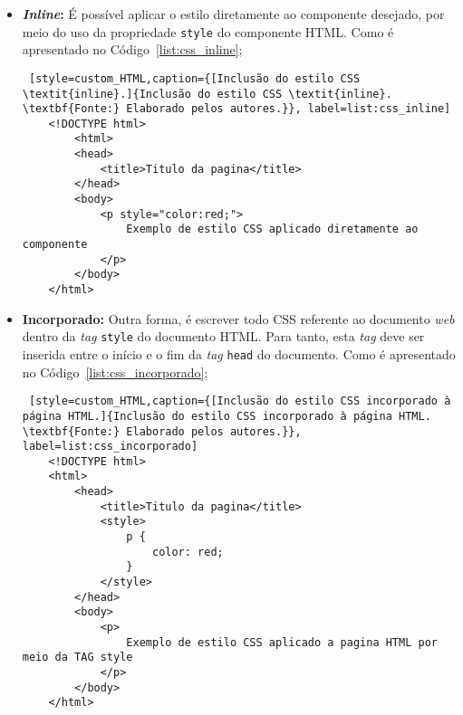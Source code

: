 \begin{itemize}
	\item \textbf{\textit{Inline}:} É possível aplicar o estilo diretamente ao componente desejado, por meio do uso da propriedade \texttt{style} do componente HTML. Como é apresentado no Código~\ref{list:css_inline};
	
	\begin{lstlisting} [style=custom_HTML,caption={[Inclusão do estilo CSS \textit{inline}.]{Inclusão do estilo CSS \textit{inline}. \textbf{Fonte:} Elaborado pelos autores.}}, label=list:css_inline] 	
	<!DOCTYPE html>
		<html>
		<head>
			<title>Titulo da pagina</title>
		</head>
		<body>
			<p style="color:red;">
				Exemplo de estilo CSS aplicado diretamente ao componente
			</p>
		</body>
	</html>
	\end{lstlisting}
	
	
	\item \textbf{Incorporado:} Outra forma, é escrever todo CSS referente ao  documento \textit{web} dentro da \textit{tag} \texttt{style} do documento HTML. Para tanto, esta \textit{tag} deve ser inserida entre o início e o fim da \textit{tag} \texttt{head} do documento. Como é apresentado no Código~\ref{list:css_incorporado};
	
	\begin{lstlisting} [style=custom_HTML,caption={[Inclusão do estilo CSS incorporado à página HTML.]{Inclusão do estilo CSS incorporado à página HTML. \textbf{Fonte:} Elaborado pelos autores.}}, label=list:css_incorporado] 	
	<!DOCTYPE html>
	<html>
		<head>
			<title>Titulo da pagina</title>
			<style>
				p {
					color: red;
				}
			</style>
		</head>
		<body>
			<p>
				Exemplo de estilo CSS aplicado a pagina HTML por meio da TAG style
			</p>
		</body>
	</html>
	\end{lstlisting}
	
	

\end{itemize}
